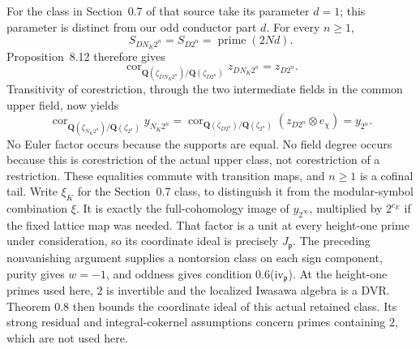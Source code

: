 For the class in Section~0.7 of that source take its parameter
$d=1$; this parameter is distinct from our odd conductor part $d$.
For every $n\geq1$,
\[
 S_{DN_K2^n}=S_{D2^n}=\operatorname{prime}(2Nd).
\]
Proposition~8.12 therefore gives
\[
 \operatorname{cor}_{\mathbf Q(\zeta_{DN_K2^n})/
                          \mathbf Q(\zeta_{D2^n})}
             z_{DN_K2^n}=z_{D2^n}.
\]
Transitivity of corestriction, through the two intermediate fields
in the common upper field, now yields
\[
 \operatorname{cor}_{\mathbf Q(\zeta_{N_K2^n})/
                          \mathbf Q(\zeta_{2^n})}y_{N_K2^n}
 =\operatorname{cor}_{\mathbf Q(\zeta_{D2^n})/
                          \mathbf Q(\zeta_{2^n})}
                         (z_{D2^n}\otimes e_\chi)
 =y_{2^n}.
\]
No Euler factor occurs because the supports are equal. No field
degree occurs because this is corestriction of the actual upper
class, not corestriction of a restriction. These equalities commute
with transition maps, and $n\geq1$ is a cofinal tail. Write
$\xi_K$ for the Section~0.7 class, to distinguish it from the
modular-symbol combination $\xi$. It is exactly the full-cohomology
image of $y_{2^\infty}$, multiplied by $2^{c_E}$ if the fixed
lattice map was needed. That factor is a unit at every height-one
prime under consideration, so its coordinate ideal is precisely
$J_{\mathfrak p}$. The preceding
nonvanishing argument supplies a nontorsion class on each sign
component, purity gives $w=-1$, and oddness gives condition
0.6(iv$_{\mathfrak p}$). At the height-one primes used here, $2$ is
invertible and the localized Iwasawa algebra is a DVR. Theorem 0.8
then bounds the coordinate ideal of this actual retained class. Its
strong residual and integral-cokernel assumptions concern primes
containing $2$, which are not used here.


